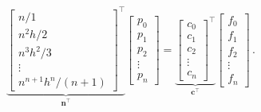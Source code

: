 \documentclass{book}
\begin{document}
\begin{equation}
    \underbrace{\begin{bmatrix}
        n/1\\
        n^2h/2\\
        n^3h^2/3\\
        \vdots \\
        n^{n+1}h^n/(n+1)
    \end{bmatrix}^\top}_{\mathbf n^\top}
    \begin{bmatrix}
        p_0\\
        p_1\\
        p_2\\
        \vdots \\
        p_n
    \end{bmatrix}
    =
    \underbrace{\begin{bmatrix}
        c_0 \\
        c_1 \\
        c_2 \\
        \vdots \\
        c_n
    \end{bmatrix}^\top}_{\mathbf c^\top}
    \begin{bmatrix}
        f_0 \\
        f_1 \\
        f_2 \\
        \vdots \\
        f_n
    \end{bmatrix} \,.\nonumber
\end{equation}
\end{document}
